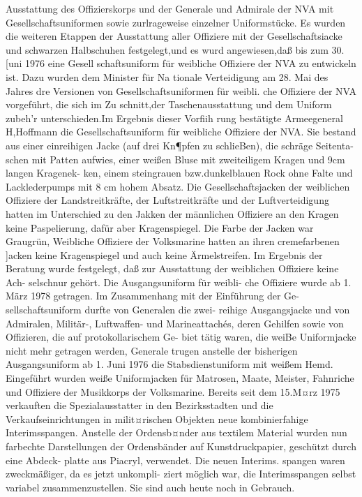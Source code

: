Ausstattung des Offizierskorps und der Generale
und Admirale der NVA mit Gesellschaftsuniformen
sowie zurlrageweise einzelner Uniformstücke.
Es wurden die weiteren Etappen der Ausstattung
aller Offiziere mit der Gesellschaftsiacke und
schwarzen Halbschuhen festgelegt,und es wurd
angewiesen,daß bis zum 30.[uni 1976 eine Gesell
schaftsuniform für weibliche Offiziere der NVA zu
entwickeln ist. Dazu wurden dem Minister für Na
tionale Verteidigung am 28. Mai des Jahres dre
Versionen von Gesellschaftsuniformen für weibli.
che Offiziere der NVA vorgeführt, die sich im Zu
schnitt,der Taschenausstattung und dem Uniform
zubeh'r unterschieden.Im Ergebnis dieser Vorfiih
rung bestätigte Armeegeneral H,Hoffmann die
Gesellschaftsuniform für weibliche Offiziere der NVA. Sie bestand aus einer einreihigen Jacke (auf
drei Kn¶pfen zu schlieBen), die schräge Seitenta-
schen mit Patten aufwies, einer weißen Bluse mit
zweiteiligem Kragen und 9cm langen Kragenek-
ken, einem steingrauen bzw.dunkelblauen Rock
ohne Falte und Lacklederpumps mit 8 cm hohem
Absatz.
Die Gesellschaftsjacken der weiblichen Offiziere
der Landstreitkräfte, der Luftstreitkräfte und der
Luftverteidigung hatten im Unterschied zu den Jakken der männlichen Offiziere an den Kragen keine
Paspelierung, dafür aber Kragenspiegel. Die Farbe
der Jacken war Graugrün, Weibliche Offiziere der
Volksmarine hatten an ihren cremefarbenen ]acken
keine Kragenspiegel und auch keine Ärmelstreifen.
Im Ergebnis der Beratung wurde festgelegt, daß
zur Ausstattung der weiblichen Offiziere keine Ach-
selschnur gehört. Die Ausgangsuniform für weibli-
che Offiziere wurde ab 1. März 1978 getragen.
Im Zusammenhang mit der Einführung der Ge-
sellschaftsuniform durfte von Generalen die zwei-
reihige Ausgangsjacke und von Admiralen, Militär-,
Luftwaffen- und Marineattachés, deren Gehilfen sowie von Offizieren, die auf protokollarischem Ge-
biet tätig waren, die weiBe Uniformjacke nicht
mehr getragen werden, Generale trugen anstelle der
bisherigen Ausgangsuniform ab 1. Juni 1976 die
Stabsdienstuniform mit weißem Hemd. Eingeführt
wurden weiße Uniformjacken für Matrosen, Maate,
Meister, Fahnriche und Offiziere der Musikkorps
der Volksmarine.
Bereits seit dem 15.M¤rz 1975 verkauften die
Spezialausstatter in den Bezirksstadten und die
Verkaufseinrichtungen in milit¤rischen Objekten
neue kombinierfahige Interimsspangen. Anstelle
der Ordensb¤nder aus textilem Material wurden
nun farbechte Darstellungen der Ordensbänder auf
Kunstdruckpapier, geschützt durch eine Abdeck-
platte aus Piacryl, verwendet. Die neuen Interims.
spangen waren zweckmäßiger, da es jetzt unkompli-
ziert möglich war, die Interimsspangen selbst
variabel zusammenzustellen. Sie sind auch heute
noch in Gebrauch.
